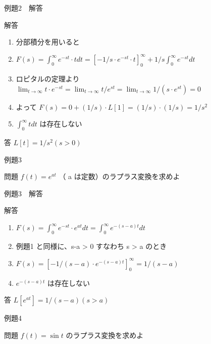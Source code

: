 \documentclass[aspectratio=43,professionalfonts,handout]{beamer}
\begin{document}
\begin{frame}{例題2　解答}
  \begin{exampleblock}{解答}
  \begin{enumerate}[1.]
    \item[] 分部積分を用いると
    \item[] $F(s) = \int_{0}^\infty e^{-st}\cdot t dt = [-1/s \cdot e^{-st} \cdot t]_{0}^\infty + 1/s \int_{0}^\infty e^{-st} dt$
    \item[] ロピタルの定理より $\lim_{t \to \infty} t\cdot e^{-st} = \lim_{t \to \infty} t/e^{st} = \lim_{t \to \infty} 1/(s\cdot e^{st}) = 0$
    \item[] よって $F(s) = 0 + (1/s)\cdot L[1] = (1/s)\cdot(1/s) = 1/s^{2}$
    \item[] $\int_{0}^\infty t dt$ は存在しない
  \end{enumerate}
  \end{exampleblock}
  \begin{alertblock}{答}
    $L[t] = 1/s^{2}  (s > 0)$
  \end{alertblock}
\end{frame}

\begin{frame}{例題3}
  \begin{exampleblock}{問題}
    $f(t) = e^{at}$ （ a は定数）のラプラス変換を求めよ\\[2pt]
  \end{exampleblock}
\end{frame}

\begin{frame}{例題3　解答}
  \begin{exampleblock}{解答}
  \begin{enumerate}[1.]
    \item[] $F(s) = \int_{0}^\infty e^{-st} \cdot e^{at} dt = \int_{0}^\infty e^{-(s-a)t} dt$
    \item[] 例題1 と同様に、s-a > 0 すなわち s > a のとき
    \item[] $F(s) = [-1/(s-a) \cdot e^{-(s-a)t}]_{0}^\infty = 1/(s-a)$
    \item[] $e^{-(s-a)t}$ は存在しない
  \end{enumerate}
  \end{exampleblock}
  \begin{alertblock}{答}
    $L[e^{at}] = 1/(s-a)  (s > a)$
  \end{alertblock}
\end{frame}

\begin{frame}{例題4}
  \begin{exampleblock}{問題}
    $f(t) = \sin t$ のラプラス変換を求めよ\\[2pt]
  \end{exampleblock}
\end{frame}
\end{document}
